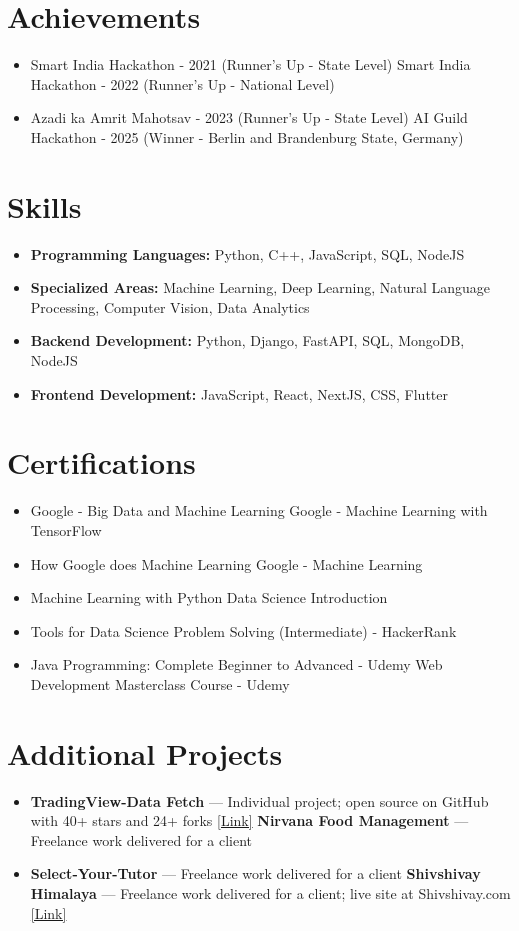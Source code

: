 \documentclass[a4paper,10pt]{article}
\begin{document}
\section*{Achievements}
\begin{itemize}
\item Smart India Hackathon - 2021 (Runner's Up - State Level) \hfill Smart India Hackathon - 2022 (Runner's Up - National Level)
\item Azadi ka Amrit Mahotsav - 2023 (Runner's Up - State Level) \hfill AI Guild Hackathon - 2025 (Winner - Berlin and Brandenburg State, Germany)
\end{itemize}

\section*{Skills}
\begin{itemize}
  \item \textbf{Programming Languages:} Python, C++, JavaScript, SQL, NodeJS
  \item \textbf{Specialized Areas:} Machine Learning, Deep Learning, Natural Language Processing, Computer Vision, Data Analytics
  \item \textbf{Backend Development:} Python, Django, FastAPI, SQL, MongoDB, NodeJS
  \item \textbf{Frontend Development:} JavaScript, React, NextJS, CSS, Flutter
\end{itemize}

\section*{Certifications}
\begin{itemize}
\item Google - Big Data and Machine Learning \hfill Google - Machine Learning with TensorFlow
\item How Google does Machine Learning \hfill Google - Machine Learning
\item Machine Learning with Python \hfill Data Science Introduction
\item Tools for Data Science \hfill Problem Solving (Intermediate) - HackerRank
\item Java Programming: Complete Beginner to Advanced - Udemy \hfill Web Development Masterclass Course - Udemy
\end{itemize}

\section*{Additional Projects}
\begin{itemize}
\item \textbf{TradingView-Data Fetch} — Individual project; open source on GitHub with 40+ stars and 24+ forks \href{https://github.com/ravalmeet/TradingView}{[Link]} \hfill \textbf{Nirvana Food Management} — Freelance work delivered for a client
\item \textbf{Select-Your-Tutor} — Freelance work delivered for a client \hfill \textbf{Shivshivay Himalaya} — Freelance work delivered for a client; live site at Shivshivay.com \href{Shivshivay.com}{[Link]}
\end{itemize}
\end{document}
